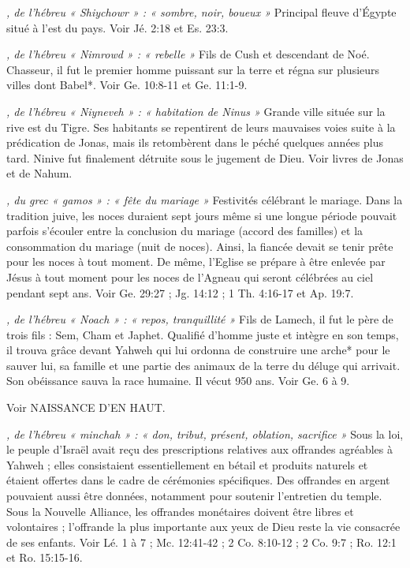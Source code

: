 \begin{multicols}{2}
{\textit{, de l'hébreu « Shiychowr » : « sombre, noir, boueux »}\newline
Principal fleuve d'Égypte situé à l'est du pays. Voir Jé. 2:18 et Es. 23:3.

\textit{, de l'hébreu « Nimrowd » : « rebelle »}\newline
Fils de Cush et descendant de Noé. Chasseur, il fut le premier homme puissant sur la terre et régna sur plusieurs villes dont Babel*. Voir Ge. 10:8-11 et Ge. 11:1-9.

\textit{, de l'hébreu « Niyneveh » : « habitation de Ninus »}\newline
Grande ville située sur la rive est du Tigre. Ses habitants se repentirent de leurs mauvaises voies suite à la prédication de Jonas, mais ils retombèrent dans le péché quelques années plus tard. Ninive fut finalement détruite sous le jugement de Dieu. Voir livres de Jonas et de Nahum.

\textit{, du grec « gamos » : « fête du mariage »}\newline
Festivités célébrant le mariage. Dans la tradition juive, les noces duraient sept jours même si une longue période pouvait parfois s'écouler entre la conclusion du mariage (accord des familles) et la consommation du mariage (nuit de noces). Ainsi, la fiancée devait se tenir prête pour les noces à tout moment. De même, l'Eglise se prépare à être enlevée par Jésus à tout moment pour les noces de l'Agneau qui seront célébrées au ciel pendant sept ans. Voir Ge. 29:27 ; Jg. 14:12 ; 1 Th. 4:16-17 et Ap. 19:7.

\textit{, de l'hébreu « Noach » : « repos, tranquillité »}\newline
Fils de Lamech, il fut le père de trois fils : Sem, Cham et Japhet. Qualifié d'homme juste et intègre en son temps, il trouva grâce devant Yahweh qui lui ordonna de construire une arche* pour le sauver lui, sa famille et une partie des animaux de la terre du déluge qui arrivait. Son obéissance sauva la race humaine. Il vécut 950 ans. Voir Ge. 6 à 9.

\textit{}\newline
Voir NAISSANCE D'EN HAUT.

\textit{, de l'hébreu « minchah » : « don, tribut, présent, oblation, sacrifice »}\newline
Sous la loi, le peuple d'Israël avait reçu des prescriptions relatives aux offrandes agréables à Yahweh ; elles consistaient essentiellement en bétail et produits naturels et étaient offertes dans le cadre de cérémonies spécifiques. Des offrandes en argent pouvaient aussi être données, notamment pour soutenir l'entretien du temple. Sous la Nouvelle Alliance, les offrandes monétaires doivent être libres et volontaires ; l'offrande la plus importante aux yeux de Dieu reste la vie consacrée de ses enfants. Voir Lé. 1 à 7 ; Mc. 12:41-42 ; 2 Co. 8:10-12 ; 2 Co. 9:7 ; Ro. 12:1 et Ro. 15:15-16.

}
\end{multicols}
